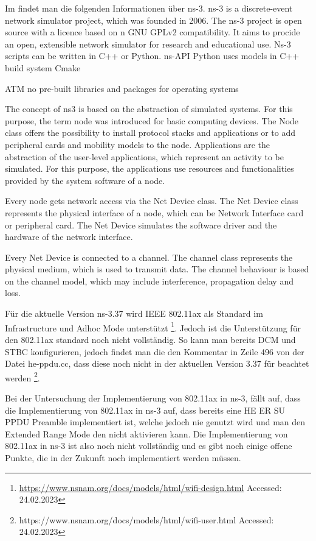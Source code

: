 \documentclass[]{nsm-thesis}
\begin{document}
Im \cite{ns3manual} findet man die folgenden Informationen über ns-3.
ns-3 is a discrete-event network simulator project, which was founded in 2006.
The ns-3 project is open source with a licence based on n GNU GPLv2 compatibility.
It aims to procide an open, extensible network simulator for research and educational use. Ns-3 scripts can be written in C++ or Python.
ns-API Python uses models in C++
build system Cmake

ATM no pre-built libraries and packages for operating systems
 
The concept of ns3 is based on the abstraction of simulated systems.
For this purpose, the term node was introduced for basic computing devices. The Node class offers the possibility to
install protocol stacks and applications or to add peripheral cards and mobility models to the node.
Applications are the abstraction of the user-level applications, which represent an activity to be simulated.
For this purpose, the applications use resources and functionalities provided by the system software of a node.

Every node gets network access via the Net Device class. The Net Device class represents the physical interface of a node,
which can be Network Interface card or peripheral card. The Net Device simulates the software driver and the hardware of the network interface.

Every Net Device is connected to a channel. The channel class represents the physical medium, which is used to transmit data. The channel behaviour is based
on the channel model, which may include interference, propagation delay and loss.

Für die aktuelle Version ns-3.37 wird IEEE 802.11ax als Standard im Infrastructure und Adhoc Mode unterstützt \footnote{\url{https://www.nsnam.org/docs/models/html/wifi-design.html} Accessed: 24.02.2023}.
Jedoch ist die Unterstützung für den 802.11ax standard noch nicht vollständig. So kann man bereits DCM und STBC konfigurieren, jedoch findet man die den Kommentar in Zeile 496 von der Datei he-ppdu.cc, dass diese noch nicht in der aktuellen Version 3.37 für beachtet werden \footnote{https://www.nsnam.org/docs/models/html/wifi-user.html Accessed: 24.02.2023}.

Bei der Untersuchung der Implementierung von 802.11ax in ns-3, fällt auf, dass die Implementierung von 802.11ax in ns-3 auf, dass bereits eine HE ER SU \ac{PPDU} Preamble implementiert ist, welche jedoch nie genutzt wird und man den Extended Range Mode
den nicht aktivieren kann. Die Implementierung von 802.11ax in ns-3 ist also noch nicht vollständig und es gibt noch einige offene Punkte, die in der Zukunft noch implementiert werden müssen.
\end{document}

